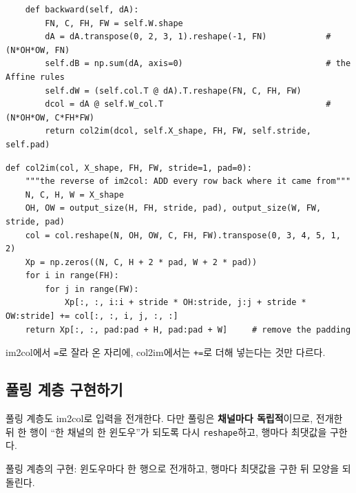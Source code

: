 \documentclass[11pt,a4paper]{article}
\begin{document}
\begin{lstlisting}
    def backward(self, dA):
        FN, C, FH, FW = self.W.shape
        dA = dA.transpose(0, 2, 3, 1).reshape(-1, FN)            # (N*OH*OW, FN)
        self.dB = np.sum(dA, axis=0)                             # the Affine rules
        self.dW = (self.col.T @ dA).T.reshape(FN, C, FH, FW)
        dcol = dA @ self.W_col.T                                 # (N*OH*OW, C*FH*FW)
        return col2im(dcol, self.X_shape, FH, FW, self.stride, self.pad)
\end{lstlisting}
\begin{lstlisting}
def col2im(col, X_shape, FH, FW, stride=1, pad=0):
    """the reverse of im2col: ADD every row back where it came from"""
    N, C, H, W = X_shape
    OH, OW = output_size(H, FH, stride, pad), output_size(W, FW, stride, pad)
    col = col.reshape(N, OH, OW, C, FH, FW).transpose(0, 3, 4, 5, 1, 2)
    Xp = np.zeros((N, C, H + 2 * pad, W + 2 * pad))
    for i in range(FH):
        for j in range(FW):
            Xp[:, :, i:i + stride * OH:stride, j:j + stride * OW:stride] += col[:, :, i, j, :, :]
    return Xp[:, :, pad:pad + H, pad:pad + W]     # remove the padding
\end{lstlisting}
im2col에서 \texttt{=}로 잘라 온 자리에, col2im에서는 \texttt{+=}로 더해 넣는다는 것만 다르다.

\subsection{풀링 계층 구현하기}\label{sec:poollayer}

풀링 계층도 im2col로 입력을 전개한다. 다만 풀링은 \textbf{채널마다 독립적}이므로,
전개한 뒤 한 행이 ``한 채널의 한 윈도우''가 되도록 다시 \texttt{reshape}하고, 행마다 최댓값을 구한다.

\begin{center}

\small 풀링 계층의 구현: 윈도우마다 한 행으로 전개하고, 행마다 최댓값을 구한 뒤 모양을 되돌린다.
\end{center}
\end{document}
